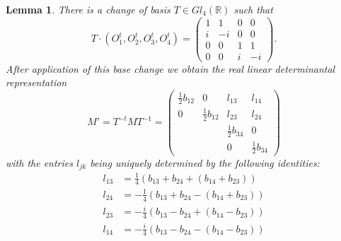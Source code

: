 \documentclass[a4paper,10pt]{amsart}
\theoremstyle{definition}
\theoremstyle{plain}
\newtheorem{lem}[Def]{Lemma}
\newcommand{\R}{{\mathbb R}}
\begin{document}
\begin{lem} \label{lem:cayleybasechange}
    There is a change of basis $T \in Gl_4(\R)$ such that
    \begin{equation*}
        T\cdot(O_1^t, O_2^t, O_3^t, O_4^t) = \begin{pmatrix}
            1 & 1 & 0 & 0 \\
            i & -i & 0 & 0 \\
            0 & 0 & 1 & 1 \\
            0 & 0 & i & -i
        \end{pmatrix}.
    \end{equation*}
    After application of this base change we obtain the real linear determinantal representation
    \begin{equation*}
        M' = T^{-t}MT^{-1} = \begin{pmatrix}
            \frac{1}{2} b_{12} & 0 & l_{13} & l_{14} \\
            0 & \frac{1}{2} b_{12} & l_{23} & l_{24} \\
            &  & \frac{1}{2} b_{34} & 0 \\
            & & 0 & \frac{1}{2} b_{34}
     \end{pmatrix}
    \end{equation*}
    with the entries $l_{jk}$ being uniquely determined by the following identities:
\begin{align*}
    l_{13} &= \frac{1}{4} (b_{13} + b_{24} + (b_{14} + b_{23})) \\
    l_{24} &= -\frac{1}{4} (b_{13} + b_{24} - (b_{14} + b_{23})) \\
    l_{23} &= -\frac{i}{4} (b_{13} - b_{24} + (b_{14} - b_{23})) \\
    l_{14} &= -\frac{i}{4} (b_{13} - b_{24} - (b_{14} - b_{23}))
\end{align*}
\end{lem}
\end{document}
